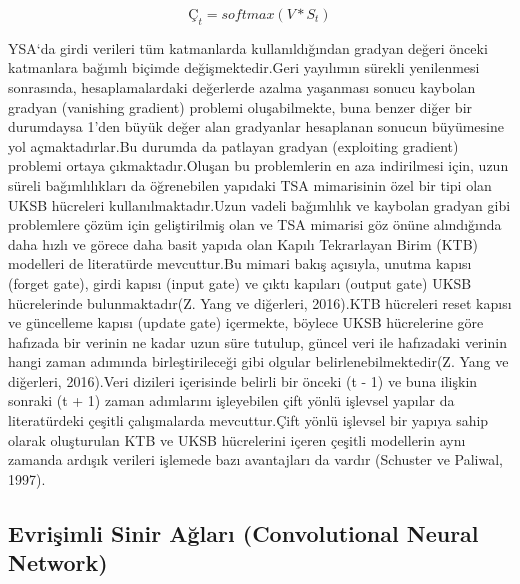 \documentclass[12pt,twoside]{deuthesis}
\begin{document}
\[Ç_{t} = softmax(V * S_{t})\]

YSA`da girdi verileri tüm katmanlarda kullanıldığından gradyan değeri önceki katmanlara bağımlı biçimde değişmektedir.Geri yayılımın sürekli yenilenmesi sonrasında, hesaplamalardaki değerlerde azalma yaşanması sonucu kaybolan gradyan (vanishing gradient) problemi oluşabilmekte, buna benzer diğer bir durumdaysa 1'den büyük değer alan gradyanlar hesaplanan sonucun büyümesine yol açmaktadırlar.Bu durumda da patlayan gradyan (exploiting gradient) problemi ortaya çıkmaktadır.Oluşan bu problemlerin en aza indirilmesi için, uzun süreli bağımlılıkları da öğrenebilen yapıdaki TSA mimarisinin özel bir tipi olan UKSB hücreleri kullanılmaktadır.Uzun vadeli bağımlılık ve kaybolan gradyan gibi problemlere çözüm için geliştirilmiş olan ve TSA mimarisi göz önüne alındığında daha hızlı ve görece daha basit yapıda olan Kapılı Tekrarlayan Birim (KTB) modelleri de literatürde mevcuttur.Bu mimari bakış açısıyla, unutma kapısı (forget gate), girdi kapısı (input gate) ve çıktı kapıları (output gate) UKSB hücrelerinde bulunmaktadır(Z. Yang ve diğerleri, 2016).KTB hücreleri reset kapısı ve güncelleme kapısı (update gate) içermekte, böylece UKSB hücrelerine göre hafızada bir verinin ne kadar uzun süre tutulup, güncel veri ile hafızadaki verinin hangi zaman adımında birleştirileceği gibi olgular belirlenebilmektedir(Z. Yang ve diğerleri, 2016).Veri dizileri içerisinde belirli bir önceki (t - 1) ve buna ilişkin sonraki (t + 1) zaman adımlarını işleyebilen çift yönlü işlevsel yapılar da literatürdeki çeşitli çalışmalarda mevcuttur.Çift yönlü işlevsel bir yapıya sahip olarak oluşturulan KTB ve UKSB hücrelerini içeren çeşitli modellerin aynı zamanda ardışık verileri işlemede bazı avantajları da vardır (Schuster ve Paliwal, 1997).

\hypertarget{evriux15fimli-sinir-aux11flarux131-convolutional-neural-network}{%
\subsection{Evrişimli Sinir Ağları (Convolutional Neural Network)}\label{evriux15fimli-sinir-aux11flarux131-convolutional-neural-network}}
\end{document}
